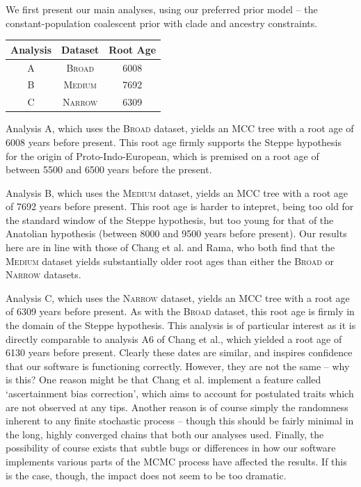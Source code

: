 \documentclass[10pt,journal,compsoc]{IEEEtran}
\begin{document}
We first present our main analyses, using our preferred prior model -- the constant-population coalescent prior with clade and ancestry constraints.

\begin{center}
    \begin{tabular}{ |c|c|c| }
    \hline
    Analysis&Dataset&Root Age\\
    \hline
    A&\textsc{Broad}&6008\\
    B&\textsc{Medium}&7692\\
    C&\textsc{Narrow}&6309\\
    \hline
    \end{tabular}
\end{center}

Analysis A, which uses the \textsc{Broad} dataset, yields an MCC tree with a root age of 6008 years before present. This root age firmly supports the Steppe hypothesis for the origin of Proto-Indo-European, which is premised on a root age of between 5500 and 6500 years before the present.

Analysis B, which uses the \textsc{Medium} dataset, yields an MCC tree with a root age of 7692 years before present. This root age is harder to intepret, being too old for the standard window of the Steppe hypothesis, but too young for that of the Anatolian hypothesis (between 8000 and 9500 years before present). Our results here are in line with those of Chang et al. and Rama, who both find that the \textsc{Medium} dataset yields substantially older root ages than either the \textsc{Broad} or \textsc{Narrow} datasets.

Analysis C, which uses the \textsc{Narrow} dataset, yields an MCC tree with a root age of 6309 years before present. As with the \textsc{Broad} dataset, this root age is firmly in the domain of the Steppe hypothesis. This analysis is of particular interest as it is directly comparable to analysis A6 of Chang et al., which yielded a root age of 6130 years before present. Clearly these dates are similar, and inspires confidence that our software is functioning correctly. However, they are not the same -- why is this? One reason might be that Chang et al. implement a feature called `ascertainment bias correction', which aims to account for postulated traits which are not observed at any tips. Another reason is of course simply the randomness inherent to any finite stochastic process -- though this should be fairly minimal in the long, highly converged chains that both our analyses used. Finally, the possibility of course exists that subtle bugs or differences in how our software implements various parts of the MCMC process have affected the results. If this is the case, though, the impact does not seem to be too dramatic.
\end{document}
